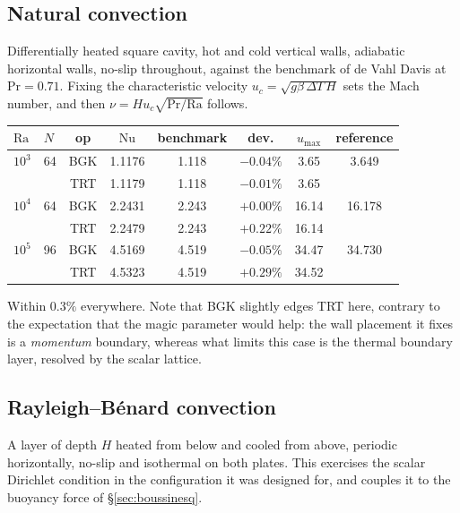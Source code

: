 \documentclass[11pt,a4paper]{article}
\begin{document}
\subsection{Natural convection}

Differentially heated square cavity, hot and cold vertical walls, adiabatic
horizontal walls, no-slip throughout, against the benchmark of de Vahl Davis
\cite{devahldavis1983} at $\mathrm{Pr}=0.71$. Fixing the characteristic velocity
$u_c=\sqrt{g\beta\,\Delta T\,H}$ sets the Mach number, and then
$\nu = H u_c\sqrt{\mathrm{Pr}/\mathrm{Ra}}$ follows.

\begin{center}\small
\begin{tabular}{llcccccc}
\toprule
$\mathrm{Ra}$ & $N$ & op & $\mathrm{Nu}$ & benchmark & dev. & $u_{\max}$ & reference \\
\midrule
$10^3$ & 64 & BGK & 1.1176 & 1.118 & $-0.04\%$ & 3.65 & 3.649 \\
       &    & TRT & 1.1179 & 1.118 & $-0.01\%$ & 3.65 & \\
$10^4$ & 64 & BGK & 2.2431 & 2.243 & $+0.00\%$ & 16.14 & 16.178 \\
       &    & TRT & 2.2479 & 2.243 & $+0.22\%$ & 16.14 & \\
$10^5$ & 96 & BGK & 4.5169 & 4.519 & $-0.05\%$ & 34.47 & 34.730 \\
       &    & TRT & 4.5323 & 4.519 & $+0.29\%$ & 34.52 & \\
\bottomrule
\end{tabular}
\end{center}

\noindent Within $0.3\%$ everywhere. Note that BGK slightly edges TRT here,
contrary to the expectation that the magic parameter would help: the wall
placement it fixes is a \emph{momentum} boundary, whereas what limits this case is
the thermal boundary layer, resolved by the scalar lattice.

\subsection{Rayleigh--B\'enard convection}
\label{sec:rbconv}
\label{sec:rb}

A layer of depth $H$ heated from below and cooled from above, periodic
horizontally, no-slip and isothermal on both plates. This exercises the scalar
Dirichlet condition in the configuration it was designed for, and couples it to
the buoyancy force of \S\ref{sec:boussinesq}.
\end{document}
